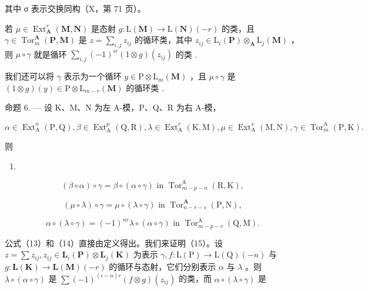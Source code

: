 其中 σ 表示交换同构（X，第 71 页）。

若 \(\mu \in \operatorname{Ext}_{\mathbf{A}}^{r}(\mathbf{M}, \mathbf{N})\) 是态射 \(g: \mathrm{L}(\mathbf{M}) \to \mathrm{L}(\mathbf{N})(-r)\) 的类，且 \(\gamma \in \operatorname{Tor}_{m}^{\mathbf{A}}(\mathbf{P}, \mathbf{M})\) 是 \(z = \sum_{i,j} z_{ij}\) 的循环类，其中 \(z_{ij} \in \mathrm{L}_i(\mathbf{P}) \otimes_{\mathbf{A}} \mathrm{L}_j(\mathbf{M})\) ，则 \(\mu \circ \gamma\) 就是循环 \(\sum_{i,j} (-1)^{ir}(1 \otimes g)(z_{ij})\) 的类 .

我们还可以将 \(\gamma\) 表示为一个循环 \(y \in \mathrm{P} \otimes \mathrm{L}_{m}(\mathbf{M})\) ，且 \(\mu \circ \gamma\) 是 \((1 \otimes g)(y) \in \mathrm{P} \otimes \mathrm{L}_{m-r}(\mathbf{M})\) 的循环类 .

命题 6. --- 设 K、M、N 为左 A-模，P、Q、R 为右 A-模，

\[
\alpha \in \operatorname{Ext} _ {\mathrm{A}} ^ {n} (\mathrm{P}, \mathrm{Q}), \beta \in \operatorname{Ext} _ {\mathrm{A}} ^ {p} (\mathrm{Q}, \mathrm{R}), \lambda \in \operatorname{Ext} _ {\mathrm{A}} ^ {r} (\mathrm{K}, \mathrm{M}), \mu \in \operatorname{Ext} _ {\mathrm{A}} ^ {s} (\mathrm{M}, \mathrm{N}), \gamma \in \operatorname{Tor} _ {m} ^ {\mathrm{A}} (\mathrm{P}, \mathrm{K}).
\]

则

\begin{enumerate}
\def\labelenumi{(\arabic{enumi})}
\setcounter{enumi}{12}
\tightlist
\item
\end{enumerate}

\[
(\beta \circ \alpha) \circ \gamma = \beta \circ (\alpha \circ \gamma) \text { in }\operatorname{Tor} _ {m - p - n} ^ {\mathrm{A}} (\mathrm{R}, \mathrm{K}),\tag{14}
\]

\[
(\mu \circ \lambda) \circ \gamma = \mu \circ (\lambda \circ \gamma) \text { in }\operatorname{Tor} _ {n - r - s} ^ {\mathbf {A}} (\mathrm{P}, \mathrm{N}),\tag{15}
\]

\[
\alpha \circ (\lambda \circ \gamma) = (- 1) ^ {n r} \lambda \circ (\alpha \circ \gamma) \text { in }\operatorname{Tor} _ {m - p - r} ^ {\mathrm{A}} (\mathrm{Q}, \mathrm{M}).
\]

公式（13）和（14）直接由定义得出。我们来证明（15）。设 \(z = \sum z_{ij}, z_{ij} \in \mathbf{L}_i(\mathbf{P}) \otimes \mathbf{L}_j(\mathbf{K})\) 为表示 \(\gamma, f: \mathrm{L}(\mathrm{P}) \to \mathrm{L}(\mathrm{Q})(-n)\) 与 \(g: \mathbf{L}(\mathbf{K}) \to \mathbf{L}(\mathbf{M})(-r)\) 的循环与态射，它们分别表示 \(\alpha\) 与 \(\lambda\) 。则 \(\lambda \circ (\alpha \circ \gamma)\) 是 \(\sum (-1)^{(i-n)r}(f \otimes g)(z_{ij})\) 的类，而 \(\alpha \circ (\lambda \circ \gamma)\) 是

